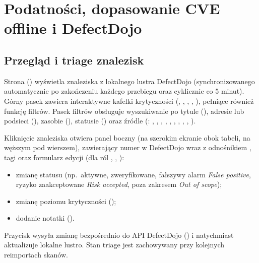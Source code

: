 \documentclass[10pt,a4paper]{article}
\begin{document}

\section{Podatności, dopasowanie CVE offline i DefectDojo}

\subsection{Przegląd i triage znalezisk}

Strona  () wyświetla znaleziska z lokalnego lustra DefectDojo (synchronizowanego automatycznie po zakończeniu każdego przebiegu oraz cyklicznie co 5 minut). Górny pasek zawiera interaktywne kafelki krytyczności (, , , , ), pełniące również funkcję filtrów. Pasek filtrów obsługuje wyszukiwanie po tytule (), adresie lub podsieci (), zasobie (), statusie () oraz źródle (: , , , , , , , , , ).

Kliknięcie znaleziska otwiera panel boczny  (na szerokim ekranie obok tabeli, na węższym pod wierszem), zawierający numer w DefectDojo wraz z odnośnikiem , tagi oraz formularz edycji (dla ról , , ):
\begin{itemize}
  \item zmianę statusu (np.~aktywne, zweryfikowane, fałszywy alarm \emph{False positive}, ryzyko zaakceptowane \emph{Risk accepted}, poza zakresem \emph{Out of scope});
  \item zmianę poziomu krytyczności ();
  \item dodanie notatki ().
\end{itemize}

Przycisk  wysyła zmianę bezpośrednio do API DefectDojo () i natychmiast aktualizuje lokalne lustro. Stan triage jest zachowywany przy kolejnych reimportach skanów.
\end{document}
